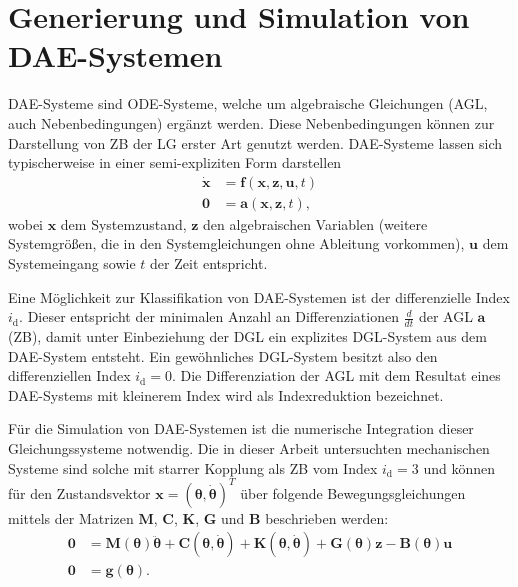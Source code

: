 \section{Generierung und Simulation von DAE-Systemen}
DAE-Systeme sind ODE-Systeme, welche um algebraische Gleichungen (AGL, auch Nebenbedingungen) ergänzt werden. Diese Nebenbedingungen können zur Darstellung von ZB der LG erster Art genutzt werden. DAE-Systeme lassen sich typischerweise in einer semi-expliziten Form darstellen
	\begin{subequations}
	\label{eq:dae_std}
	\begin{align}
		\mathbf{\dot{x}} &= \mathbf{f}(\mathbf{x}, \mathbf{z}, \mathbf{u}, t) \\
		\mathbf{0} &= \mathbf{a}(\mathbf{x}, \mathbf{z}, t),
	\end{align}
	\end{subequations}
wobei $\mathbf{x}$ dem Systemzustand, $\mathbf{z}$ den algebraischen Variablen (weitere Systemgrößen, die in den Systemgleichungen ohne Ableitung vorkommen), $\mathbf{u}$ dem Systemeingang sowie $t$ der Zeit entspricht. \cite[S.137]{JanschekSystementwurf}

Eine Möglichkeit zur Klassifikation von DAE-Systemen ist der differenzielle Index $i_\mathrm{d}$. Dieser entspricht der minimalen Anzahl an Differenziationen $\frac{d}{dt}$ der AGL $\mathbf{a}$ (ZB), damit unter Einbeziehung der DGL ein explizites DGL-System aus dem DAE-System entsteht. Ein gewöhnliches DGL-System besitzt also den differenziellen Index $i_\mathrm{d} = 0$. Die Differenziation der AGL mit dem Resultat eines DAE-Systems mit kleinerem Index wird als Indexreduktion bezeichnet. \cite[S.139]{JanschekSystementwurf}

Für die Simulation von DAE-Systemen ist die numerische Integration dieser Gleichungssysteme notwendig. Die in dieser Arbeit untersuchten mechanischen Systeme sind solche mit starrer Kopplung als ZB vom Index $i_\mathrm{d} = 3$ und können für den Zustandsvektor $\mathbf{x} = (\boldsymbol{\theta}, \dot{\boldsymbol{\theta}})^T$ über folgende Bewegungsgleichungen mittels der Matrizen $\mathbf{M}$, $\mathbf{C}$, $\mathbf{K}$, $\mathbf{G}$ und $\mathbf{B}$ beschrieben werden:
\begin{subequations}
\label{eq:implicit_mechanical_system}
\begin{align}
	\mathbf{0} &= \mathbf{M}(\boldsymbol{\theta}) \ddot{\boldsymbol{\theta}} + \mathbf{C}(\boldsymbol{\theta}, \dot{\boldsymbol{\theta}}) + \mathbf{K}(\boldsymbol{\theta}, \dot{\boldsymbol{\theta}}) + \mathbf{G}(\boldsymbol{\theta}) \mathbf{z} - \mathbf{B}(\boldsymbol{\theta}) \mathbf{u}\\
	\mathbf{0} &= \mathbf{g}(\boldsymbol{\theta}).
\end{align}
\end{subequations}
\cite[S.240]{JanschekSystementwurf}

